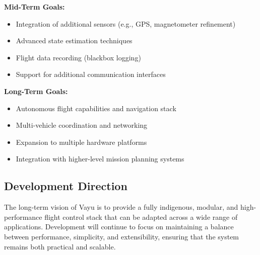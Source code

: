 \textbf{Mid-Term Goals:}
\begin{itemize}
    \item Integration of additional sensors (e.g., GPS, magnetometer refinement)
    \item Advanced state estimation techniques
    \item Flight data recording (blackbox logging)
    \item Support for additional communication interfaces
\end{itemize}

\textbf{Long-Term Goals:}
\begin{itemize}
    \item Autonomous flight capabilities and navigation stack
    \item Multi-vehicle coordination and networking
    \item Expansion to multiple hardware platforms
    \item Integration with higher-level mission planning systems
\end{itemize}

\subsection{Development Direction}

The long-term vision of Vayu is to provide a fully indigenous, modular, and high-performance flight control stack that can be adapted across a wide range of applications. Development will continue to focus on maintaining a balance between performance, simplicity, and extensibility, ensuring that the system remains both practical and scalable.
